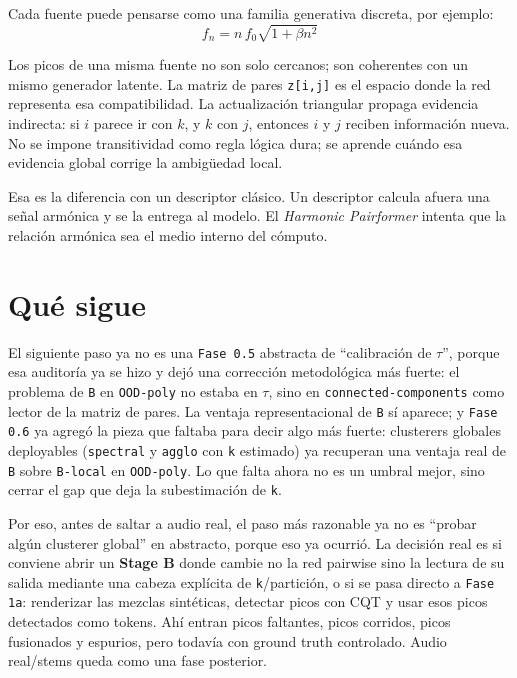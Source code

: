 \documentclass[11pt]{article}
\begin{document}
Cada fuente puede pensarse como una familia generativa discreta, por ejemplo:
\[
  f_n = n\,f_0\sqrt{1 + \beta n^2}
\]

Los picos de una misma fuente no son solo cercanos; son coherentes con un mismo generador latente. La matriz de pares \texttt{z[i,j]} es el espacio donde la red representa esa compatibilidad. La actualización triangular propaga evidencia indirecta: si $i$ parece ir con $k$, y $k$ con $j$, entonces $i$ y $j$ reciben información nueva. No se impone transitividad como regla lógica dura; se aprende cuándo esa evidencia global corrige la ambigüedad local.

Esa es la diferencia con un descriptor clásico. Un descriptor calcula afuera una señal armónica y se la entrega al modelo. El \emph{Harmonic Pairformer} intenta que la relación armónica sea el medio interno del cómputo.

\section{Qué sigue}

El siguiente paso ya no es una \texttt{Fase 0.5} abstracta de ``calibración de $\tau$'', porque esa auditoría ya se hizo y dejó una corrección metodológica más fuerte: el problema de \texttt{B} en \texttt{OOD-poly} no estaba en $\tau$, sino en \texttt{connected-components} como lector de la matriz de pares. La ventaja representacional de \texttt{B} sí aparece; y \texttt{Fase 0.6} ya agregó la pieza que faltaba para decir algo más fuerte: clusterers globales deployables (\texttt{spectral} y \texttt{agglo} con \texttt{k} estimado) ya recuperan una ventaja real de \texttt{B} sobre \texttt{B-local} en \texttt{OOD-poly}. Lo que falta ahora no es un umbral mejor, sino cerrar el gap que deja la subestimación de \texttt{k}.

Por eso, antes de saltar a audio real, el paso más razonable ya no es ``probar algún clusterer global'' en abstracto, porque eso ya ocurrió. La decisión real es si conviene abrir un \textbf{Stage B} donde cambie no la red pairwise sino la lectura de su salida mediante una cabeza explícita de \texttt{k}/partición, o si se pasa directo a \texttt{Fase 1a}: renderizar las mezclas sintéticas, detectar picos con CQT y usar esos picos detectados como tokens. Ahí entran picos faltantes, picos corridos, picos fusionados y espurios, pero todavía con ground truth controlado. Audio real/stems queda como una fase posterior.
\end{document}
